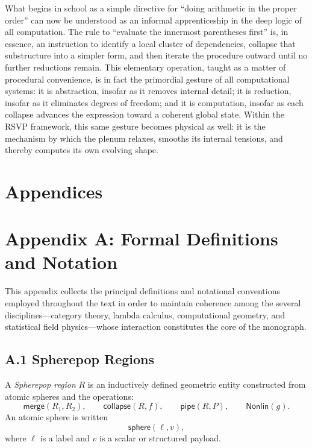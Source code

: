 \documentclass[11pt,letterpaper]{article}
\begin{document}
What begins in school as a simple directive for ``doing arithmetic in the proper
order'' can now be understood as an informal apprenticeship in the deep logic of
all computation.  The rule to ``evaluate the innermost parentheses first'' is, in
essence, an instruction to identify a local cluster of dependencies, collapse
that substructure into a simpler form, and then iterate the procedure outward
until no further reductions remain.  This elementary operation, taught as a
matter of procedural convenience, is in fact the primordial gesture of all
computational systems: it is abstraction, insofar as it removes internal detail;
it is reduction, insofar as it eliminates degrees of freedom; and it is
computation, insofar as each collapse advances the expression toward a coherent
global state.  Within the RSVP framework, this same gesture becomes physical as
well: it is the mechanism by which the plenum relaxes, smooths its internal
tensions, and thereby computes its own evolving shape.

\appendix
\section*{Appendices}


\section{Appendix A: Formal Definitions and Notation}

This appendix collects the principal definitions and notational conventions
employed throughout the text in order to maintain coherence among the several
disciplines---category theory, lambda calculus, computational geometry, and
statistical field physics---whose interaction constitutes the core of the
monograph.

\subsection*{A.1 Spherepop Regions}
A \emph{Spherepop region} $R$ is an inductively defined geometric entity constructed
from atomic spheres and the operations:
\[
\mathsf{merge}(R_1,R_2), 
\qquad
\mathsf{collapse}(R,f),
\qquad
\mathsf{pipe}(R,P),
\qquad
\mathsf{Nonlin}(g).
\]
An atomic sphere is written
\[
\mathsf{sphere}(\ell, v),
\]
where $\ell$ is a label and $v$ is a scalar or structured payload.
\end{document}
